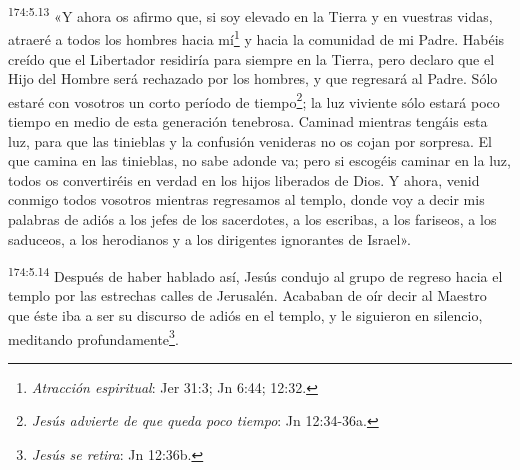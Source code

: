\par 
\textsuperscript{174:5.13} «Y ahora os afirmo que, si soy elevado en la Tierra y en vuestras vidas, atraeré a todos los hombres hacia mí\footnote{\textit{Atracción espiritual}: Jer 31:3; Jn 6:44; 12:32.} y hacia la comunidad de mi Padre. Habéis creído que el Libertador residiría para siempre en la Tierra, pero declaro que el Hijo del Hombre será rechazado por los hombres, y que regresará al Padre. Sólo estaré con vosotros un corto período de tiempo\footnote{\textit{Jesús advierte de que queda poco tiempo}: Jn 12:34-36a.}; la luz viviente sólo estará poco tiempo en medio de esta generación tenebrosa. Caminad mientras tengáis esta luz, para que las tinieblas y la confusión venideras no os cojan por sorpresa. El que camina en las tinieblas, no sabe adonde va; pero si escogéis caminar en la luz, todos os convertiréis en verdad en los hijos liberados de Dios. Y ahora, venid conmigo todos vosotros mientras regresamos al templo, donde voy a decir mis palabras de adiós a los jefes de los sacerdotes, a los escribas, a los fariseos, a los saduceos, a los herodianos y a los dirigentes ignorantes de Israel».

\par 
\textsuperscript{174:5.14} Después de haber hablado así, Jesús condujo al grupo de regreso hacia el templo por las estrechas calles de Jerusalén. Acababan de oír decir al Maestro que éste iba a ser su discurso de adiós en el templo, y le siguieron en silencio, meditando profundamente\footnote{\textit{Jesús se retira}: Jn 12:36b.}.